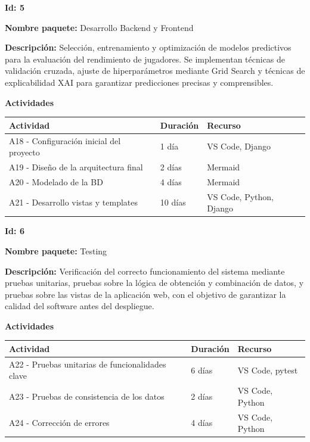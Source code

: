\vspace{0.5cm}

\textbf{Id: 5}

\textbf{Nombre paquete:} Desarrollo Backend y Frontend

\textbf{Descripción:} Selección, entrenamiento y optimización de modelos predictivos para la evaluación del rendimiento de jugadores. Se implementan técnicas de validación cruzada, ajuste de hiperparámetros mediante Grid Search y técnicas de explicabilidad XAI para garantizar predicciones precisas y comprensibles.

\textbf{Actividades}

\begin{center}
\small
\begin{tabular}{|p{}|p{}|p{}|}
\hline
\textbf{Actividad} & \textbf{Duración} & \textbf{Recurso} \\
\hline
A18 - Configuración inicial del proyecto & 1 día & VS Code, Django \\
\hline
A19 - Diseño de la arquitectura final & 2 días & Mermaid \\
\hline
A20 - Modelado de la BD & 4 días & Mermaid \\
\hline
A21 - Desarrollo vistas y templates & 10 días & VS Code, Python, Django \\
\hline
\end{tabular}
\end{center}

\vspace{0.5cm}

\textbf{Id: 6}

\textbf{Nombre paquete:} Testing

\textbf{Descripción:} Verificación del correcto funcionamiento del sistema mediante pruebas unitarias, pruebas sobre la lógica de obtención y combinación de datos, y pruebas sobre las vistas de la aplicación web, con el objetivo de garantizar la calidad del software antes del despliegue.

\textbf{Actividades}

\begin{center}
\small
\begin{tabular}{|p{}|p{}|p{}|}
\hline
\textbf{Actividad} & \textbf{Duración} & \textbf{Recurso} \\
\hline
A22 - Pruebas unitarias de funcionalidades clave & 6 días & VS Code, pytest \\
\hline
A23 - Pruebas de consistencia de los datos & 2 días & VS Code, Python \\
\hline
A24 - Corrección de errores & 4 días & VS Code, Python \\
\hline
\end{tabular}
\end{center}

